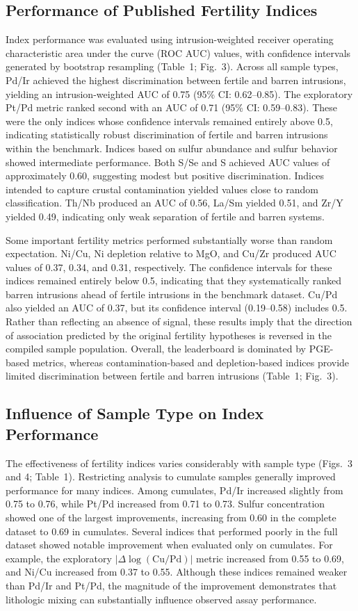 \documentclass[10pt,twocolumn,letterpaper]{article}
\begin{document}
\subsection{Performance of Published Fertility Indices}
Index performance was evaluated using intrusion-weighted receiver operating characteristic area under the curve (ROC AUC) values, with confidence intervals generated by bootstrap resampling (Table~1; Fig.~3). Across all sample types, Pd/Ir achieved the highest discrimination between fertile and barren intrusions, yielding an intrusion-weighted AUC of 0.75 (95\% CI: 0.62--0.85). The exploratory Pt/Pd metric ranked second with an AUC of 0.71 (95\% CI: 0.59--0.83). These were the only indices whose confidence intervals remained entirely above 0.5, indicating statistically robust discrimination of fertile and barren intrusions within the benchmark. Indices based on sulfur abundance and sulfur behavior showed intermediate performance. Both S/Se and S achieved AUC values of approximately 0.60, suggesting modest but positive discrimination. Indices intended to capture crustal contamination yielded values close to random classification. Th/Nb produced an AUC of 0.56, La/Sm yielded 0.51, and Zr/Y yielded 0.49, indicating only weak separation of fertile and barren systems.

Some important fertility metrics performed substantially worse than random expectation. Ni/Cu, Ni depletion relative to MgO, and Cu/Zr produced AUC values of 0.37, 0.34, and 0.31, respectively. The confidence intervals for these indices remained entirely below 0.5, indicating that they systematically ranked barren intrusions ahead of fertile intrusions in the benchmark dataset. Cu/Pd also yielded an AUC of 0.37, but its confidence interval (0.19--0.58) includes 0.5. Rather than reflecting an absence of signal, these results imply that the direction of association predicted by the original fertility hypotheses is reversed in the compiled sample population. Overall, the leaderboard is dominated by PGE-based metrics, whereas contamination-based and depletion-based indices provide limited discrimination between fertile and barren intrusions (Table~1; Fig.~3).

\subsection{Influence of Sample Type on Index Performance}
The effectiveness of fertility indices varies considerably with sample type (Figs.~3 and 4; Table~1). Restricting analysis to cumulate samples generally improved performance for many indices. Among cumulates, Pd/Ir increased slightly from 0.75 to 0.76, while Pt/Pd increased from 0.71 to 0.73. Sulfur concentration showed one of the largest improvements, increasing from 0.60 in the complete dataset to 0.69 in cumulates. Several indices that performed poorly in the full dataset showed notable improvement when evaluated only on cumulates. For example, the exploratory $|\Delta\log(\mathrm{Cu/Pd})|$ metric increased from 0.55 to 0.69, and Ni/Cu increased from 0.37 to 0.55. Although these indices remained weaker than Pd/Ir and Pt/Pd, the magnitude of the improvement demonstrates that lithologic mixing can substantially influence observed assay performance.
\end{document}
